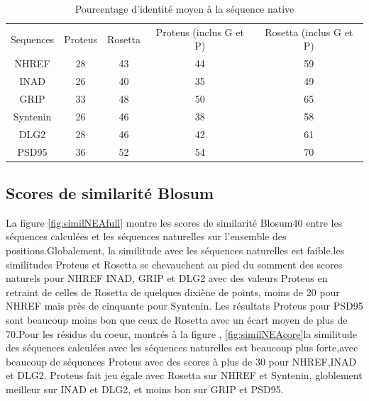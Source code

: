         \begin{table}[!htbp]
      \centering

      \begin{tabular}{ccccc}

        \toprule
        Sequences & Proteus & Rosetta & Proteus (inclus G et P) & Rosetta (inclus G et P)\\
        \cmidrule{1-5}
        NHREF  & 28 &  43 & 44 & 59 \\
        INAD  & 26 &  40 & 35 & 49 \\
        GRIP  & 33 &  48 & 50 & 65 \\
        Syntenin  & 26 &  46 & 38 & 58 \\
        DLG2  & 28 &  46 & 42 & 61 \\
        PSD95  & 36 &  52 & 54 & 70 \\
        \bottomrule

      \end{tabular}      
      \caption{Pourcentage d'identité moyen à la séquence native}
\label{tab:IdentNEA}      
    \end{table}

        
        
\subsection{Scores de similarité Blosum}

La figure \ref{fig:similNEAfull} montre les scores de similarité Blosum40 entre les séquences calculées et les séquences naturelles sur l'ensemble des positions.Globalement, la similitude avec les séquences naturelles est faible.les similitudes Proteus et Rosetta se chevauchent au pied du somment des scores naturels pour NHREF INAD, GRIP et DLG2 avec des valeurs Proteus en retraint de celles de Rosetta de quelques dixiène de points, moins de 20 pour NHREF mais près de cinquante pour Syntenin. Les résultats Proteus pour PSD95 sont beaucoup moins bon que ceux de Rosetta avec un écart moyen de plus de 70.Pour les résidus du coeur, montrés à la figure , \ref{fig:similNEAcore}la similitude des séquences calculées avec les séquences naturelles est beaucoup plus forte,avec beaucoup de séquences Proteus avec des scores à plus de 30 pour NHREF,INAD et DLG2. Proteus fait jeu égale avec Rosetta sur NHREF et Syntenin, globlement meilleur sur INAD et DLG2, et moins bon sur GRIP et PSD95. 


